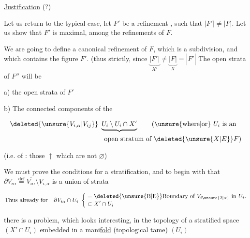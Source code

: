 
\uline{Justification} (?)


Let us return to the typical case, let $F'$ be a refinement , such that $|F'|\neq|F|$. Let us show that $F'$ is  maximal,  among the refinements of $F$.

We are going to define a canonical refinement  of $F$, which is  a subdivision, and which contains the figure $F'$. (thus strictly, since $\underbrace{|F'|}_{X'}\neq\underbrace{|F|}_{X}=|\overline{F'}|$ The  open strata of $F''$ will be

a) the open strata  of $F'$

b) The connected components  of the

\[
\begin{aligned}
&\deleted{\unsure{V_{i,\alpha}|V_{ij}}}\ \underbrace{U_i\setminus U_i\cap X'}\qquad \text{(\unsure{where|or} } U_i \text{ is an}\\
&\hspace{14em}\text{open stratum of } \deleted{\unsure{X|E}}F\text{)}
\end{aligned}
\]

(i.e. of : those $\uparrow$ which are not $\varnothing$)

 We must prove the conditions for a stratification, and to begin with that $\partial V_{i\alpha}\overset{\mathrm{def}}{=}\overline{V_{i\alpha}}\setminus V_{i,\alpha}$ is a union of strata

\[
\text{Thus already for}\quad \partial V_{i\alpha}\cap U_i\ \left\{\begin{aligned}&=\text{\deleted{\unsure{B|E}}Boundary of } V_{i\unsure{2|\alpha}}\text{ in }U_i\text{.}\\[-2pt]&\subset X'\cap U_i\end{aligned}\right.
\]

there is a problem, which looks interesting, in the topology of a stratified space $(X'\cap U_i)$ embedded in a mani\uline{fold} (topological  tame) $(U_i)$
